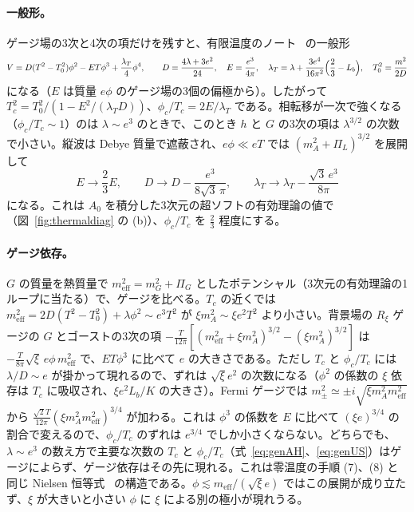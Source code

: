 \documentclass[a4paper,10pt]{ltjsarticle}
\begin{document}
\paragraph{一般形。}ゲージ場の3次と4次の項だけを残すと、有限温度のノート~\cite{thermalnote} の一般形
\begin{equation}
V=D(T^2-T_0^2)\phi^2-ET\phi^3+\frac{\lambda_T}4\phi^4,\qquad
D=\frac{4\lambda+3e^2}{24},\quad E=\frac{e^3}{4\pi},\quad \lambda_T=\lambda+\frac{3e^4}{16\pi^2}\Bigl(\frac23-L_b\Bigr),\quad T_0^2=\frac{m^2}{2D}
\label{eq:genAH}
\end{equation}
になる（$E$ は質量 $e\phi$ のゲージ場の3個の偏極から）。したがって $T_c^2=T_0^2/(1-E^2/(\lambda_TD))$、$\phi_c/T_c=2E/\lambda_T$ である。相転移が一次で強くなる（$\phi_c/T_c\sim1$）のは $\lambda\sim e^3$ のときで、このとき $h$ と $G$ の3次の項は $\lambda^{3/2}$ の次数で小さい。縦波は Debye 質量で遮蔽され、$e\phi\ll eT$ では $(m_A^2+\Pi_L)^{3/2}$ を展開して
\begin{equation}
E\to\frac23E,\qquad D\to D-\frac{e^3}{8\sqrt3\,\pi},\qquad \lambda_T\to\lambda_T-\frac{\sqrt3\,e^3}{8\pi}
\label{eq:genUS}
\end{equation}
になる。これは $A_0$ を積分した3次元の超ソフトの有効理論の値で（図~\ref{fig:thermaldiag} の (b)）、$\phi_c/T_c$ を $\frac23$ 程度にする。

\paragraph{ゲージ依存。}$G$ の質量を熱質量で $m_{\mathrm{eff}}^2=m_G^2+\Pi_G$ としたポテンシャル（3次元の有効理論の1ループに当たる）で、ゲージを比べる。$T_c$ の近くでは $m_{\mathrm{eff}}^2=2D(T^2-T_0^2)+\lambda\phi^2\sim e^3T^2$ が $\xi m_A^2\sim\xi e^2T^2$ より小さい。背景場の $R_\xi$ ゲージの $G$ とゴーストの3次の項 $-\frac T{12\pi}[(m_{\mathrm{eff}}^2+\xi m_A^2)^{3/2}-(\xi m_A^2)^{3/2}]$ は $-\frac T{8\pi}\sqrt\xi\,e\phi\,m_{\mathrm{eff}}^2$ で、$ET\phi^3$ に比べて $e$ の大きさである。ただし $T_c$ と $\phi_c/T_c$ には $\lambda/D\sim e$ が掛かって現れるので、ずれは $\sqrt\xi e^2$ の次数になる（$\phi^2$ の係数の $\xi$ 依存は $T_c$ に吸収され、$\xi e^2L_b/K$ の大きさ）。Fermi ゲージでは $m_\pm^2\simeq\pm i\sqrt{\xi m_A^2m_{\mathrm{eff}}^2}$ から $\frac{\sqrt2T}{12\pi}(\xi m_A^2m_{\mathrm{eff}}^2)^{3/4}$ が加わる。これは $\phi^3$ の係数を $E$ に比べて $(\xi e)^{3/4}$ の割合で変えるので、$\phi_c/T_c$ のずれは $e^{3/4}$ でしか小さくならない。どちらでも、$\lambda\sim e^3$ の数え方で主要な次数の $T_c$ と $\phi_c/T_c$（式~\eqref{eq:genAH}、\eqref{eq:genUS}）はゲージによらず、ゲージ依存はその先に現れる。これは零温度の手順 (7)、(8) と同じ Nielsen 恒等式~\cite{nielsen75} の構造である。$\phi\lesssim m_{\mathrm{eff}}/(\sqrt\xi e)$ ではこの展開が成り立たず、$\xi$ が大きいと小さい $\phi$ に $\xi$ による別の極小が現れうる。
\end{document}
